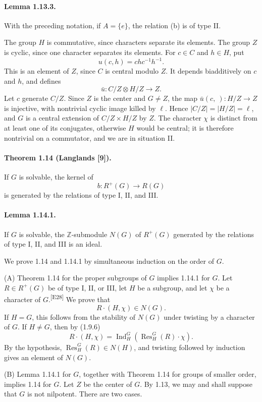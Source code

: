 \documentclass[10pt,letterpaper]{article}
\newcommand{\Z}{\mathbb Z}
\newcommand{\Ind}{\operatorname{Ind}}
\newcommand{\Res}{\operatorname{Res}}
\providecommand{\Ind}{\operatorname{Ind}}
\newcommand{\auditmark}[1]{\textsuperscript{\normalfont\scriptsize[E#1]}}
\begin{document}
\paragraph{Lemma 1.13.3.} With the preceding notation, if \(A=\{e\}\), the relation (b) is of type II.

The group \(H\) is commutative, since characters separate its elements. The group \(Z\) is cyclic, since one character separates its elements. For \(c\in C\) and \(h\in H\), put
\[
u(c,h)=chc^{-1}h^{-1}.
\]
This is an element of \(Z\), since \(C\) is central modulo \(Z\). It depends biadditively on \(c\) and \(h\), and defines
\[
\bar u:C/Z\otimes H/Z\longrightarrow Z.
\]
Let \(c\) generate \(C/Z\). Since \(Z\) is the center and \(G\ne Z\), the map \(\bar u(c,\ ):H/Z\to Z\) is injective, with nontrivial cyclic image killed by \(\ell\). Hence \(|C/Z|=|H/Z|=\ell\), and \(G\) is a central extension of \(C/Z\times H/Z\) by \(Z\). The character \(\chi\) is distinct from at least one of its conjugates, otherwise \(H\) would be central; it is therefore nontrivial on a commutator, and we are in situation II.

\paragraph{Theorem 1.14 (Langlands [9]).} If \(G\) is solvable, the kernel of
\[
b:R^+(G)\longrightarrow R(G)
\]
is generated by the relations of type I, II, and III.

\paragraph{Lemma 1.14.1.} If \(G\) is solvable, the \(\Z\)-submodule \(N(G)\) of \(R^+(G)\) generated by the relations of type I, II, and III is an ideal.

We prove 1.14 and 1.14.1 by simultaneous induction on the order of \(G\).

(A) Theorem 1.14 for the proper subgroups of \(G\) implies 1.14.1 for \(G\). Let \(R\in R^+(G)\) be of type I, II, or III, let \(H\) be a subgroup, and let \(\chi\) be a character of \(G\).\auditmark{28} We prove that
\[
R\cdot(H,\chi)\in N(G).
\]
If \(H=G\), this follows from the stability of \(N(G)\) under twisting by a character of \(G\). If \(H\ne G\), then by (1.9.6)
\[
R\cdot(H,\chi)=\Ind_H^G(\Res_H^G(R)\cdot\chi).
\]
By the hypothesis, \(\Res_H^G(R)\in N(H)\), and twisting followed by induction gives an element of \(N(G)\).

(B) Lemma 1.14.1 for \(G\), together with Theorem 1.14 for groups of smaller order, implies 1.14 for \(G\). Let \(Z\) be the center of \(G\). By 1.13, we may and shall suppose that \(G\) is not nilpotent. There are two cases.
\end{document}
